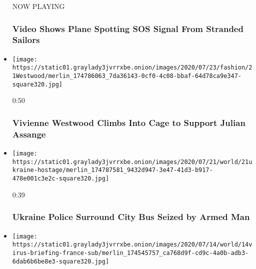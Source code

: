 \begin{itemize}
  NOW PLAYING

  \hypertarget{video-shows-plane-spotting-sos-signal-from-stranded-sailors-1}{%
  \subsubsection{Video Shows Plane Spotting SOS Signal From Stranded
  Sailors}\label{video-shows-plane-spotting-sos-signal-from-stranded-sailors-1}}
\item
  \href{https://www.nytimes3xbfgragh.onion/video/us/100000007249534/vivienne-westwood-canary-julian-assange.html?action=click\&module=video-series-bar\&region=header\&pgtype=Article\&playlistId=video/world}{}

  \texttt{[image: https://static01.graylady3jvrrxbe.onion/images/2020/07/23/fashion/21Westwood/merlin\_174786063\_7da36143-0cf0-4c08-bbaf-64d78ca9e347-square320.jpg]}

  0:50

  \hypertarget{vivienne-westwood-climbs-into-cage-to-support-julian-assange}{%
  \subsubsection{Vivienne Westwood Climbs Into Cage to Support Julian
  Assange}\label{vivienne-westwood-climbs-into-cage-to-support-julian-assange}}
\item
  \href{https://www.nytimes3xbfgragh.onion/video/us/100000007249315/hostages-on-ukraine-city-bus.html?action=click\&module=video-series-bar\&region=header\&pgtype=Article\&playlistId=video/world}{}

  \texttt{[image: https://static01.graylady3jvrrxbe.onion/images/2020/07/21/world/21ukraine-hostage/merlin\_174787581\_9432d947-3e47-41d3-b917-478e001c3e2c-square320.jpg]}

  0:39

  \hypertarget{ukraine-police-surround-city-bus-seized-by-armed-man}{%
  \subsubsection{Ukraine Police Surround City Bus Seized by Armed
  Man}\label{ukraine-police-surround-city-bus-seized-by-armed-man}}
\item
  \href{https://www.nytimes3xbfgragh.onion/video/world/europe/100000007237802/france-bastille-day-virus.html?action=click\&module=video-series-bar\&region=header\&pgtype=Article\&playlistId=video/world}{}

  \texttt{[image: https://static01.graylady3jvrrxbe.onion/images/2020/07/14/world/14virus-briefing-france-sub/merlin\_174545757\_ca768d9f-cd9c-4a0b-adb3-6dab6b6be8e3-square320.jpg]}


\end{itemize}
